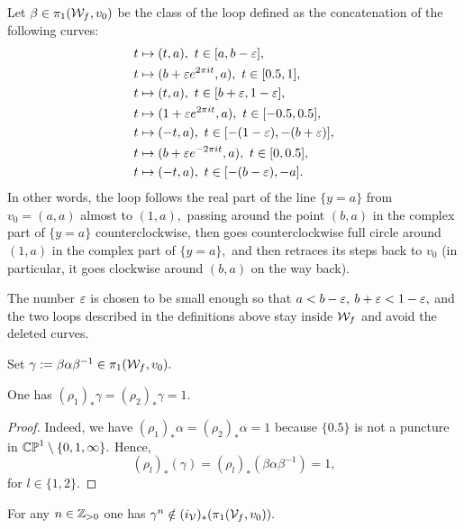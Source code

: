\documentclass{article}
\begin{document}
\begin{definition}\label{def:beta}
    Let $\beta\in\pi_1(\mathcal{W}_f,v_0)$ be the class of the loop defined as the concatenation of the following curves:
\begin{align*}
    &t\mapsto (t,a),\ t\in [a,b-\varepsilon],\\
    &t\mapsto (b+\varepsilon e^{2\pi i t},a),\  t\in [0.5,1],\\
    &t\mapsto (t,a),\ t\in [b+\varepsilon,1-\varepsilon],\\
    &t\mapsto (1+\varepsilon e^{2\pi i t},a),\ t\in [-0.5,0.5],\\
    &t\mapsto (-t,a),\ t\in [-(1-\varepsilon),-(b+\varepsilon)],\\
    &t\mapsto (b+\varepsilon e^{-2\pi i t},a),\ t\in [0,0.5],\\
    &t\mapsto (-t,a),\ t\in [-(b-\varepsilon),-a].
\end{align*}
In other words, the loop follows the real part of the line $\{y=a\}$ from $v_0=(a,a)$ almost to $(1,a),$ passing around the point $(b,a)$ in the complex part of $\{y=a\}$ counterclockwise, then goes counterclockwise full circle around $(1,a)$ in the complex part of $\{y=a\},$ and then retraces its steps back to $v_0$ (in particular, it goes clockwise around $(b,a)$ on the way back).
\end{definition}

The number $\varepsilon$ is chosen to be small enough so that $a<b-\varepsilon,$ $b+\varepsilon<1-\varepsilon,$ and the two loops described in the definitions above stay inside $\mathcal{W}_f$ and avoid the deleted curves. 

\begin{definition}
    Set $\gamma:=\beta\alpha\beta^{-1}\in\pi_1(\mathcal{W}_f,v_0).$
\end{definition}

\begin{lemma}
One has $(\rho_1)_*\gamma=(\rho_2)_*\gamma=1.$  
\end{lemma}

\begin{proof}
    Indeed, we have $(\rho_1)_*\alpha=(\rho_2)_*\alpha=1$ because $\{0.5\}$ is not a puncture in $\mathbb{CP}^1\setminus \{0,1,\infty\}.$ Hence, 
$$
(\rho_l)_*(\gamma)=(\rho_l)_*(\beta\alpha\beta^{-1})=1,
$$
for $l\in\{1,2\}.$
\end{proof}

\begin{theorem}
    For any $n\in \mathbb{Z}_{>0}$ one has $\gamma^n\notin (i_{\mathcal{V}})_*(\pi_1(\mathcal{V}_f,v_0)).$
\end{theorem}
\end{document}
